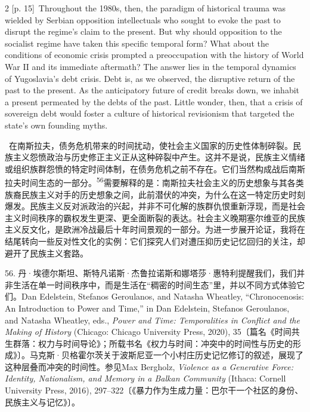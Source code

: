 \documentclass[10pt,a4paper]{article}
\begin{document}
\begin{paracol}{2}
\switchcolumn
{\scriptsize\color{gray} [p. 15]}\ Throughout the 1980s, then, the paradigm of historical trauma was wielded by Serbian opposition intellectuals who sought to evoke the past to disrupt the regime’s claim to the present. But why should opposition to the socialist regime have taken this specific temporal form? What about the conditions of economic crisis prompted a preoccupation with the history of World War II and its immediate aftermath? The answer lies in the temporal dynamics of Yugoslavia’s debt crisis. Debt is, as we observed, the disruptive return of the past to the present. As the anticipatory future of credit breaks down, we inhabit a present permeated by the debts of the past. Little wonder, then, that a crisis of sovereign debt would foster a culture of historical revisionism that targeted the state’s own founding myths.\par
\switchcolumn*
{\scriptsize\color{gray} [p. 15]}\ 在南斯拉夫，债务危机带来的时间扰动，使社会主义国家的历史性体制碎裂。民族主义怨愤政治与历史修正主义正从这种碎裂中产生。这并不是说，民族主义情绪或组织族群怨愤的特定时间体制，在债务危机之前不存在。它们当然构成战后南斯拉夫时间生态的一部\mbox{分。\textsuperscript{56}}需要解释的是：南斯拉夫社会主义的历史想象与其各类族裔民族主义对手的历史想象之间，此前潜伏的冲突，为什么在这一特定历史时刻爆发。民族主义反对派政治的兴起，并非不可化解的族群仇恨重新浮现，而是社会主义时间秩序的霸权发生更深、更全面断裂的表达。社会主义晚期塞尔维亚的民族主义反文化，是欧洲冷战最后十年时间景观的一部分。为进一步展开论证，我将在结尾转向一些反对性文化的实例：它们探究人们对遭压抑历史记忆回归的关注，却避开了民族主义套路。\par{\small 56. 丹·埃德尔斯坦、斯特凡诺斯·杰鲁拉诺斯和娜塔莎·惠特利提醒我们，我们并非生活在单一时间秩序中，而是生活在“稠密的时间生态”里，并以不同方式体验它们。Dan Edelstein, Stefanos Geroulanos, and Natasha Wheatley, “Chronocenosis: An Introduction to Power and Time,” in Dan Edelstein, Stefanos Geroulanos, and Natasha Wheatley, eds., \textit{Power and Time: Temporalities in Conflict and the Making of History} (Chicago: Chicago University Press, 2020), 35〔篇名《时间共生群落：权力与时间导论》；所载书名《权力与时间：冲突中的时间性与历史的形成》〕。马克斯·贝格霍尔茨关于波斯尼亚一个小村庄历史记忆修订的叙述，展现了这种层叠而冲突的时间性。参见Max Bergholz, \textit{Violence as a Generative Force: Identity, Nationalism, and Memory in a Balkan Community} (Ithaca: Cornell University Press, 2016), 297–322〔《暴力作为生成力量：巴尔干一个社区的身份、民族主义与记忆》〕。\par}
\switchcolumn

\end{paracol}
\end{document}
